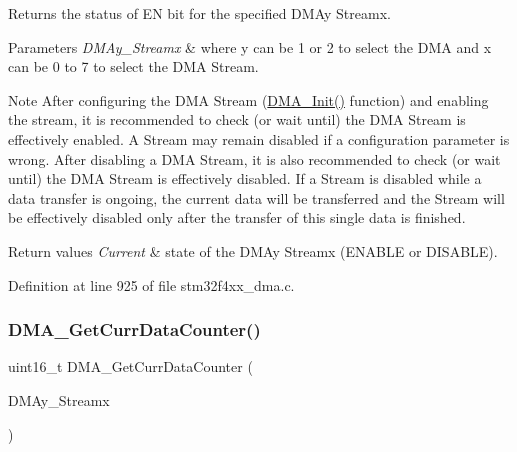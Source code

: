 Returns the status of EN bit for the specified D\+M\+Ay Streamx. 


\begin{DoxyParams}{Parameters}
{\em D\+M\+Ay\+\_\+\+Streamx} & where y can be 1 or 2 to select the D\+MA and x can be 0 to 7 to select the D\+MA Stream.\\
\hline
\end{DoxyParams}
\begin{DoxyNote}{Note}
After configuring the D\+MA Stream (\hyperlink{group___d_m_a___group1_gaced8a4149acfb0a50b50e63273a87148}{D\+M\+A\+\_\+\+Init()} function) and enabling the stream, it is recommended to check (or wait until) the D\+MA Stream is effectively enabled. A Stream may remain disabled if a configuration parameter is wrong. After disabling a D\+MA Stream, it is also recommended to check (or wait until) the D\+MA Stream is effectively disabled. If a Stream is disabled while a data transfer is ongoing, the current data will be transferred and the Stream will be effectively disabled only after the transfer of this single data is finished.
\end{DoxyNote}

\begin{DoxyRetVals}{Return values}
{\em Current} & state of the D\+M\+Ay Streamx (E\+N\+A\+B\+LE or D\+I\+S\+A\+B\+LE). \\
\hline
\end{DoxyRetVals}


Definition at line 925 of file stm32f4xx\+\_\+dma.\+c.

\mbox{\label{group___d_m_a_ga4a76444a92423f5f15a4328738d6dc46}} 
\subsubsection{\texorpdfstring{D\+M\+A\+\_\+\+Get\+Curr\+Data\+Counter()}{DMA\_GetCurrDataCounter()}}
{\footnotesize\ttfamily uint16\+\_\+t D\+M\+A\+\_\+\+Get\+Curr\+Data\+Counter (\begin{DoxyParamCaption}\item[{\hyperlink{struct_d_m_a___stream___type_def}{D\+M\+A\+\_\+\+Stream\+\_\+\+Type\+Def} $\ast$}]{D\+M\+Ay\+\_\+\+Streamx }\end{DoxyParamCaption})}



